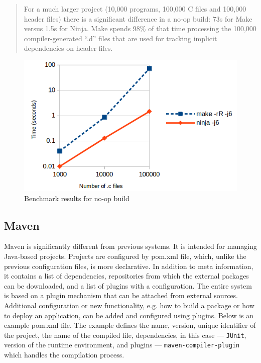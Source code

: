 \begin{quote}
For a much larger project (10,000 programs, 100,000 C files and 100,000
header files) there is a significant difference in a no-op build: 73s
for Make versus 1.5s for Ninja. Make spends 98\% of that time processing
the 100,000 compiler-generated ``.d'' files that are used for tracking
implicit dependencies on header files.
\end{quote}

\begin{figure}
\centering
\includegraphics[scale=0.70]{./no-op-build.png}
\caption{Benchmark results for no-op build \cite{BENCHMARK}}
\end{figure}

\hypertarget{maven}{%
\subsection{Maven}\label{maven}}

Maven is significantly different from previous systems. It is intended
for managing Java-based projects. Projects are configured by pom.xml
file, which, unlike the previous configuration files, is more
declarative. In addition to meta information, it contains a list of
dependencies, repositories from which the external packages can be
downloaded, and a list of plugins with a configuration. The entire system
is based on a plugin mechanism that can be attached from external
sources. Additional configuration or new functionality, e.g. how to
build a package or how to deploy an application, can be added and
configured using plugins. Below is an example pom.xml file.
The example defines the name, version, unique identifier of the project,
the name of the compiled file, dependencies, in this case --- \texttt{JUnit},
version of the runtime environment, and plugins --- \texttt{maven-compiler-plugin}
which handles the compilation process.

